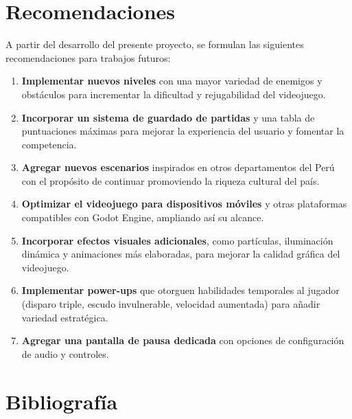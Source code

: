 \documentclass[12pt, a4paper, oneside]{report}
\begin{document}
\newpage

\chapter{Recomendaciones}

A partir del desarrollo del presente proyecto, se formulan las siguientes recomendaciones para trabajos futuros:

\begin{enumerate}
    \item \textbf{Implementar nuevos niveles} con una mayor variedad de enemigos y obstáculos para incrementar la dificultad y rejugabilidad del videojuego.

    \item \textbf{Incorporar un sistema de guardado de partidas} y una tabla de puntuaciones máximas para mejorar la experiencia del usuario y fomentar la competencia.

    \item \textbf{Agregar nuevos escenarios} inspirados en otros departamentos del Perú con el propósito de continuar promoviendo la riqueza cultural del país.

    \item \textbf{Optimizar el videojuego para dispositivos móviles} y otras plataformas compatibles con Godot Engine, ampliando así su alcance.

    \item \textbf{Incorporar efectos visuales adicionales}, como partículas, iluminación dinámica y animaciones más elaboradas, para mejorar la calidad gráfica del videojuego.

    \item \textbf{Implementar power-ups} que otorguen habilidades temporales al jugador (disparo triple, escudo invulnerable, velocidad aumentada) para añadir variedad estratégica.

    \item \textbf{Agregar una pantalla de pausa dedicada} con opciones de configuración de audio y controles.
\end{enumerate}

\newpage

\chapter{Bibliografía}
\end{document}
